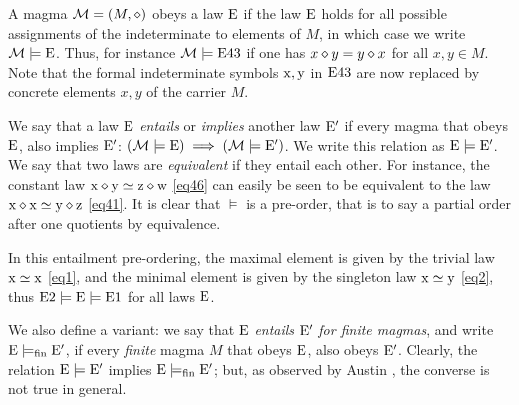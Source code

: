 A magma ${\mathcal{M}} = (M,\diamond)$ obeys a law $\mathrm{E}$ if the law $\mathrm{E}$ holds for all possible assignments of the indeterminate to elements of $M$, in which case we write ${\mathcal{M}} \models \mathrm{E}$. Thus, for instance ${\mathcal{M}} \models \mathrm{E}43$ if one has $x \diamond y = y \diamond x$ for all $x,y \in M$.  Note that the formal indeterminate symbols $\mathrm{x}, \mathrm{y}$ in $\mathrm{E}43$ are now replaced by concrete elements $x,y$ of the carrier $M$.

We say that a law $\mathrm{E}$ \emph{entails} or \emph{implies} another law ${\mathrm{E}'}$ if every magma that obeys $\mathrm{E}$, also implies ${\mathrm{E}'}$: $({\mathcal{M}} \models \mathrm{E}) \implies ({\mathcal{M}} \models {\mathrm{E}'})$.  We write this relation as ${\mathrm{E}} \models {\mathrm{E}'}$. We say that two laws are \emph{equivalent} if they entail each other. For instance, the constant law $\mathrm{x} \diamond \mathrm{y} \simeq \mathrm{z} \diamond \mathrm{w}$ \eqref{eq46} can easily be seen to be equivalent to the law $\mathrm{x} \diamond \mathrm{x} \simeq \mathrm{y} \diamond \mathrm{z}$ \eqref{eq41}.  It is clear that $\models$ is a pre-order, that is to say a partial order after one quotients by equivalence.

In this entailment pre-ordering, the maximal element is given by the trivial law $\mathrm{x}\simeq\mathrm{x}$ \eqref{eq1}, and the minimal element is given by the singleton law $\mathrm{x}\simeq \mathrm{y}$ \eqref{eq2}, thus $\mathrm{E}2 \models {\mathrm{E}} \models \mathrm{E}1$ for all laws $\mathrm{E}$.

We also define a variant: we say that $\mathrm{E}$ \emph{entails} ${\mathrm{E}'}$ \emph{for finite magmas}, and write ${\mathrm{E}} \models_{\mathrm{fin}} {\mathrm{E}'}$, if every \emph{finite} magma $M$ that obeys $\mathrm{E}$, also obeys ${\mathrm{E}'}$.  Clearly, the relation ${\mathrm{E}} \models {\mathrm{E}'}$ implies ${\mathrm{E}} \models_{\mathrm{fin}} {\mathrm{E}'}$; but, as observed by Austin \cite{austin_finite}, the converse is not true in general.

